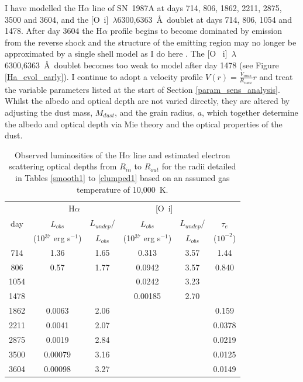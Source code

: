I have modelled the H$\alpha$ line of SN~1987A at days 714, 806, 1862, 
2211, 2875, 3500 and 3604, and the [O~{\sc i}]~$\lambda$6300,6363~\AA\ 
doublet at days 714, 806, 1054 and 1478.  After day 3604 the H$\alpha$ 
profile begins to become dominated by emission from the reverse shock and 
the structure of the emitting region may no longer be approximated by a 
single shell model as I do here \citep{Fransson2013}.  The [O~{\sc 
i}]~$\lambda$6300,6363~\AA\ doublet becomes too weak to model after day 
1478 (see Figure \ref{Ha_evol_early}).  I continue to adopt a velocity 
profile $V(r) = \frac{V_{max}}{R_{max}}r$ and treat the variable 
parameters listed at the start of Section \ref{param_sens_analysis}.  Whilst the albedo and 
optical depth are not varied directly, they are altered by adjusting the 
dust mass, $M_{dust}$, and the grain radius, $a$, which together determine 
the albedo and optical depth via Mie theory and the optical properties of 
the dust.

\setlength{\tabcolsep}{10pt}
\begin{table}
\caption{Observed luminosities of the H$\alpha$ line and estimated 
electron scattering optical depths from $R_{in}$ to $R_{out}$ for the 
radii detailed in Tables \ref{smooth1} to \ref{clumped1} based on an 
assumed gas temperature of 10,000~K.}
\centering
\begin{tabular}{@{}cccccc@{}}
\hline
& \multicolumn{2}{c}{H$\alpha$} &  \multicolumn{2}{c}{[O~{\sc i}]}  \\
day &  $L_{obs}$ & $L_{undep}$/  &  $L_{obs}$ & $L_{undep}$/   & $\tau_e$ \\
& (10$^{37}$ erg s$^{-1}$) &$L_{obs}$& (10$^{37}$ erg s$^{-1}$) & $L_{obs}$& ($10^{-2}$) \\
\hline
714 & 1.36 & 1.65 &0.313&3.57& 1.44  \\
806 & 0.57 & 1.77 &0.0942&3.57& 0.840 \\
1054 &&&0.0242 & 3.23\\
1478 &&& 0.00185&2.70 \\
1862 & 0.0063 & 2.06 &&& 0.159  \\
2211 & 0.0041 & 2.07 &&& 0.0378  \\
2875 & 0.0019 & 2.84 & & &0.0219  \\
3500 & 0.00079 & 3.16 & &&0.0125  \\
3604 & 0.00098 & 3.27 &&&0.0149  \\

\hline
\end{tabular}

\label{tau_e}
\end{table}%
\setlength{\tabcolsep}{8pt}


